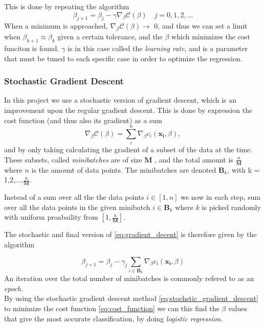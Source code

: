 This is done by repeating the algorithm
\begin{equation}
    \beta_{j+1} = \beta_j - \gamma \nabla_\beta \mathcal{C}(\beta) \quad j = 0,1,2,...
    \label{eq:gradient_decent}
\end{equation}
When a minimum is approached, $\nabla_\beta \mathcal{C}(\beta) \rightarrow$ 0, and thus we can set a limit when $\beta_{k+1} \approx \beta_k$ given a certain tolerance, and the $\beta$ which minimizes the cost funciton is found. $\gamma$ is in this case called the \textit{learning rate}, and is a parameter that must be tuned to each specific case in order to optimize the regression.

\subsubsection*{Stochastic Gradient Descent}
In this project we use a stochastic version of gradient descent, which is an improvement upon the regular gradient descent. This is done by expression the cost function (and thus also its gradient) as a sum
\begin{equation}
    \nabla_\beta \mathcal{C}(\beta) = \sum_i^n     \nabla_\beta c_i(\boldsymbol{x_i},\beta) ,
    \label{eq:gradient_sum}
\end{equation}
and by only taking calculating the gradient of a subset of the data at the time. These subsets, called \textit{minibatches} are of size $\boldsymbol{M}$ , and the total amount is $\frac{n}{\boldsymbol{M}}$ where $n$ is the amount of data points. The minibatches are denoted $\boldsymbol{B}_k$, with k = 1,2,...,$\frac{n}{\boldsymbol{M}}$.

Instead of a sum over all the the data points $i \in [1,n]$ we now in each step, sum over all the data points in the given minibatch $i \in \boldsymbol{B}_k$ where $k$ is picked randomly with uniform proabaility from $[1, \frac{n}{\boldsymbol{M}}]$.

The stochastic and final version of \eqref{eq:gradient_decent} is therefore given by the algorithm

\begin{equation}
    \beta_{j+1} = \beta_j - \gamma_j \sum_{i \in \boldsymbol{B}_k}\nabla_\beta c_i(\boldsymbol{x_i},\beta)
    \label{eq:stochstic_gradient_descent}
\end{equation}
An iteration over the total number of minibatches is commonly refered to as an \textit{epoch.}\\

By using the stochastic gradient descent method \eqref{eq:stochstic_gradient_descent} to minimize the cost function \eqref{eq:cost_function} we can this find the $\beta$ values that give the most accurate classification, by doing \textit{logistic regression}.

